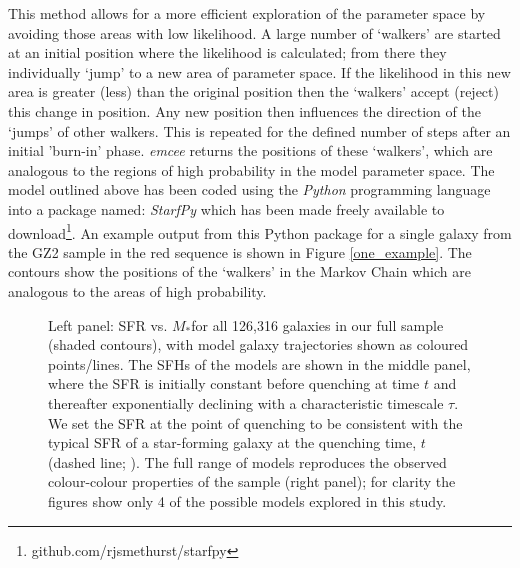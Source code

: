 \documentclass[useAMS,usenatbib]{mn2e}
\def\changed    {\color{titlecol} }
\begin{document}
This method allows for a more efficient exploration of the parameter space by avoiding those areas with low likelihood. A large number of `walkers' are started at an initial position where the likelihood is calculated; from there they individually `jump' to a new area of parameter space. If the likelihood in this new area is greater (less) than the original position then the `walkers' accept (reject) this change in position. Any new position then influences the direction of the  `jumps' of other walkers.  {\changed This is repeated for the defined number of steps after an initial 'burn-in' phase. \emph{emcee} returns the positions of these `walkers', which are analogous to the regions of high probability in the model parameter space.} The model outlined above has been coded using the \emph{Python} programming language into a package named: \emph{StarfPy} which has been made freely available to download\footnote{{\changed github.com/rjsmethurst/starfpy}}. {\changed An example output from this Python package for a single galaxy from the GZ2 sample in the red sequence is shown in Figure \ref{one_example}. The contours show the positions of the `walkers' in the Markov Chain which are analogous to the areas of high probability.}

\begin{figure}
\caption{Left panel: SFR vs. $M_*$for all 126,316 galaxies in our full sample (shaded contours), with model galaxy trajectories shown as coloured points/lines. The SFHs of the models are shown in the middle panel, where the SFR is initially constant before quenching at time $t$ and thereafter exponentially declining with a characteristic timescale $\tau$. We set the SFR at the point of quenching to be consistent with the typical SFR of a star-forming galaxy at the quenching time, $t$ (dashed line; \citealt{Peng}). The full range of models reproduces the observed colour-colour properties of the sample (right panel); for clarity the figures show only 4 of the possible models explored in this study.}
\label{sfr_mass_col}
\end{figure}
\end{document}
